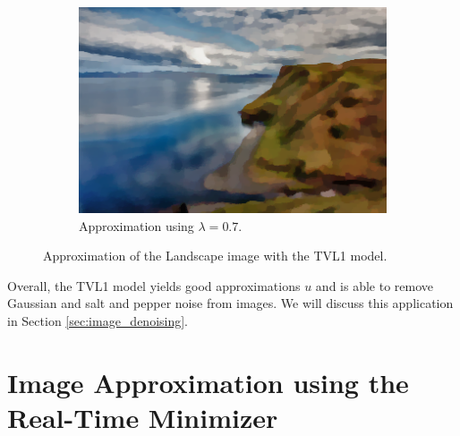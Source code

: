 \documentclass[abstracton]{scrreprt}
\begin{document}
\begin{figure}[!ht]
\begin{subfigure}[b]{0.32\textwidth}
                    \includegraphics[width=\textwidth]{img/approximation/07landscape.png}
                    \caption{Approximation using $\lambda = 0.7$.}
                \end{subfigure}
                \caption[Best approximation using the TVL1 model with Landscape image.]{Approximation of the Landscape image with the TVL1 model.}
                \label{fig:best_tvl1_landscape}
            \end{figure}
            
            Overall, the TVL1 model yields good approximations $u$ and is able to remove Gaussian and salt and pepper noise from images. We will discuss this application in Section \ref{sec:image_denoising}.

    \section{Image Approximation using the Real-Time Minimizer} %
    \label{sec:image_approximation_using_the_real_time_minimizer}
        
\end{document}
